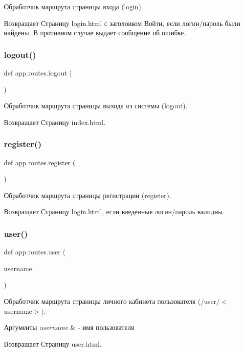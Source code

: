 Обработчик маршрута страницы входа (login). 

\begin{DoxyReturn}{Возвращает}
Страницу login.\+html с заголовком Войти, если логин/пароль были найдены. В противном случае выдает сообщение об ошибке. 
\end{DoxyReturn}
\mbox{\label{namespaceapp_1_1routes_a3031cfc20f4e9f9624a1a7351483fcb3}} 
\subsubsection{\texorpdfstring{logout()}{logout()}}
{\footnotesize\ttfamily def app.\+routes.\+logout (\begin{DoxyParamCaption}{ }\end{DoxyParamCaption})}



Обработчик маршрута страницы выхода из системы (logout). 

\begin{DoxyReturn}{Возвращает}
Страницу index.\+html. 
\end{DoxyReturn}
\mbox{\label{namespaceapp_1_1routes_a0b407a7e4cb0434704eed996b1e254dd}} 
\subsubsection{\texorpdfstring{register()}{register()}}
{\footnotesize\ttfamily def app.\+routes.\+register (\begin{DoxyParamCaption}{ }\end{DoxyParamCaption})}



Обработчик маршрута страницы регистрации (register). 

\begin{DoxyReturn}{Возвращает}
Страницу login.\+html, если введенные логин/пароль валидны. 
\end{DoxyReturn}
\mbox{\label{namespaceapp_1_1routes_af3a249d21729abda41005c787d883843}} 
\subsubsection{\texorpdfstring{user()}{user()}}
{\footnotesize\ttfamily def app.\+routes.\+user (\begin{DoxyParamCaption}\item[{}]{username }\end{DoxyParamCaption})}



Обработчик маршрута страницы личного кабинета пользователя (/user/$<$username$>$). 


\begin{DoxyParams}{Аргументы}
{\em username} & -\/ имя пользователя \\
\hline
\end{DoxyParams}
\begin{DoxyReturn}{Возвращает}
Страницу user.\+html. 
\end{DoxyReturn}
